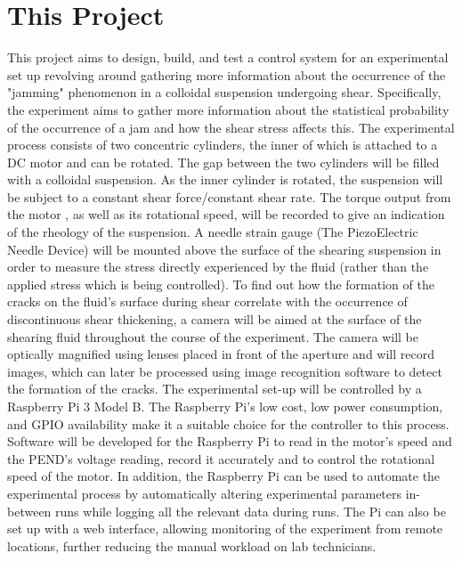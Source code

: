 \documentclass[a4]{report}
\begin{document}
	\section{This Project}
	This project aims to design, build, and test a control system for an experimental set up revolving around gathering more information about the occurrence of the "jamming" phenomenon in a colloidal suspension undergoing shear. Specifically, the experiment aims to gather more information about the statistical probability of the occurrence of a jam and how the shear stress affects this. 
	The experimental process consists of two concentric cylinders, the inner of which is attached to a DC motor and can be rotated. The gap between the two cylinders will be filled with a colloidal suspension. As the inner cylinder is rotated, the suspension will be subject to a constant shear force/constant shear rate. The torque output from the motor , as well as its rotational speed, will be recorded to give an indication of the rheology of the suspension. A needle strain gauge (The PiezoElectric Needle Device) will be mounted above the surface of the shearing suspension in order to measure the stress directly experienced by the fluid (rather than the applied stress which is being controlled). \newline \newline \noindent
	To find out how the formation of the cracks on the fluid's surface during shear correlate with the occurrence of discontinuous shear thickening, a camera will be aimed at the surface of the shearing fluid throughout the course of the experiment. The camera will be optically magnified using lenses placed in front of the aperture and will record images, which can later be processed using image recognition software to detect the formation of the cracks. \newline \newline \noindent
	The experimental set-up will be controlled by a Raspberry Pi 3 Model B. The Raspberry Pi's low cost, low power consumption, and GPIO availability make it a suitable choice for the controller to this process. Software will be developed for the Raspberry Pi to read in the motor's speed and the PEND's voltage reading, record it accurately and to control the rotational speed of the motor. In addition, the Raspberry Pi can be used to automate the experimental process by automatically altering experimental parameters in-between runs while logging all the relevant data during runs. The Pi can also be set up with a web interface, allowing monitoring of the experiment from remote locations, further reducing the manual workload on lab technicians.
\end{document}
